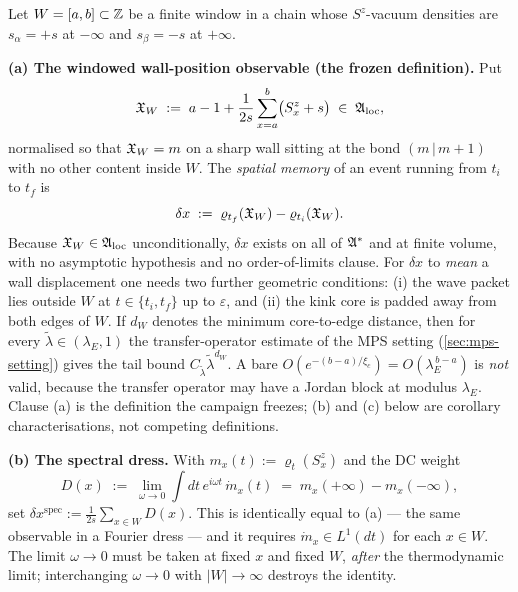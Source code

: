 \begin{definition}
\label{def:memory-observables}
Let $W=[a,b]\subset\mathbb{Z}$ be a finite window in a chain whose $S^z$-vacuum
densities are $s_\alpha=+s$ at $-\infty$ and $s_\beta=-s$ at $+\infty$.

\smallskip
\noindent\textbf{(a) The windowed wall-position observable (the frozen
definition).} Put
\begin{equation}
  \mathfrak{X}_W \;:=\; a-1+\frac{1}{2s}\sum_{x=a}^{b}\bigl(S^z_x+s\bigr)
  \;\in\;\mathfrak{A}_{\mathrm{loc}},
  \label{eq:wallX}
\end{equation}
normalised so that $\mathfrak{X}_W=m$ on a sharp wall sitting at the bond
$(m\,|\,m+1)$ with no other content inside $W$. The \emph{spatial memory} of an
event running from $t_i$ to $t_f$ is
\begin{equation}
  \delta x \;:=\; \varrho_{t_f}(\mathfrak{X}_W)-\varrho_{t_i}(\mathfrak{X}_W).
  \label{eq:deltax}
\end{equation}
Because $\mathfrak{X}_W\in\mathfrak{A}_{\mathrm{loc}}$ unconditionally, $\delta x$ exists on
all of $\mathfrak{A}^*$ and at finite volume, with no asymptotic hypothesis and no
order-of-limits clause. For $\delta x$ to \emph{mean} a wall displacement one
needs two further geometric conditions: (i) the wave packet lies outside $W$ at
$t\in\{t_i,t_f\}$ up to $\varepsilon$, and (ii) the kink core is padded away
from both edges of $W$. If $d_W$ denotes the minimum core-to-edge distance, then
for every $\tilde\lambda\in(\lambda_E,1)$ the transfer-operator estimate of the
MPS setting (\cref{sec:mps-setting}) gives the tail bound
$C_{\tilde\lambda}\tilde\lambda^{d_W}$. A bare
$O(e^{-(b-a)/\xi_c})=O(\lambda_E^{\,b-a})$ is \emph{not} valid, because the
transfer operator may have a Jordan block at modulus $\lambda_E$. Clause (a) is
the definition the campaign freezes; (b) and (c) below are corollary
characterisations, not competing definitions.

\smallskip
\noindent\textbf{(b) The spectral dress.} With $m_x(t):=\varrho_t(S^z_x)$ and
the DC weight
\begin{equation}
  D(x)\;:=\;\lim_{\omega\to0}\int dt\,e^{i\omega t}\,\dot m_x(t)
  \;=\;m_x(+\infty)-m_x(-\infty),
\end{equation}
set $\delta x^{\mathrm{spec}}:=\frac{1}{2s}\sum_{x\in W}D(x)$. This is
identically equal to (a) --- the same observable in a Fourier dress --- and it
requires $\dot m_x\in L^1(dt)$ for each $x\in W$. The limit $\omega\to0$ must be
taken at fixed $x$ and fixed $W$, \emph{after} the thermodynamic limit;
interchanging $\omega\to0$ with $|W|\to\infty$ destroys the identity.


\end{definition}
